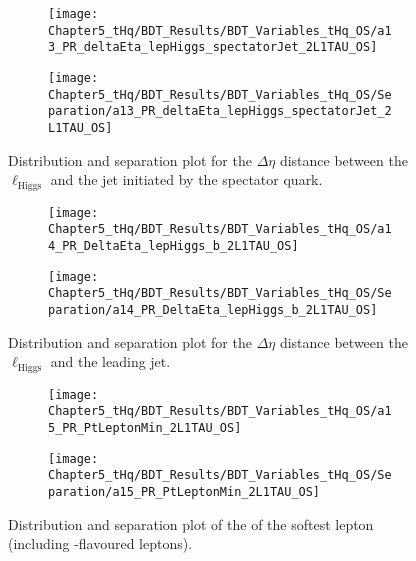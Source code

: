 \begin{figure}[h]
\centering
\begin{subfigure}{.45\textwidth}
  \centering
  \texttt{[image: Chapter5\_tHq/BDT\_Results/BDT\_Variables\_tHq\_OS/a13\_PR\_deltaEta\_lepHiggs\_spectatorJet\_2L1TAU\_OS]}
\end{subfigure}%
\begin{subfigure}{.55\textwidth}
  \centering
  \texttt{[image: Chapter5\_tHq/BDT\_Results/BDT\_Variables\_tHq\_OS/Separation/a13\_PR\_deltaEta\_lepHiggs\_spectatorJet\_2L1TAU\_OS]}
\end{subfigure}
\caption{Distribution and separation plot for the $\Delta \eta$ distance between the $\ell_{\text{Higgs}}$ and
the jet initiated by the spectator quark.}
\label{fig:Appendix:BDTVARS:tHqOS:a13_PR_deltaEta_lepHiggs_spectatorJet}
\end{figure}

\begin{figure}[h]
\centering
\begin{subfigure}{.45\textwidth}
  \centering
  \texttt{[image: Chapter5\_tHq/BDT\_Results/BDT\_Variables\_tHq\_OS/a14\_PR\_DeltaEta\_lepHiggs\_b\_2L1TAU\_OS]}
\end{subfigure}%
\begin{subfigure}{.55\textwidth}
  \centering
  \texttt{[image: Chapter5\_tHq/BDT\_Results/BDT\_Variables\_tHq\_OS/Separation/a14\_PR\_DeltaEta\_lepHiggs\_b\_2L1TAU\_OS]}
\end{subfigure}
\caption{Distribution and separation plot for the $\Delta \eta$ distance between the $\ell_{\text{Higgs}}$ and 
the leading \btagged jet.}
\label{fig:Appendix:BDTVARS:tHqOS:a14_PR_DeltaEta_lepHiggs_b}
\end{figure}

\begin{figure}[h]
\centering
\begin{subfigure}{.45\textwidth}
  \centering
  \texttt{[image: Chapter5\_tHq/BDT\_Results/BDT\_Variables\_tHq\_OS/a15\_PR\_PtLeptonMin\_2L1TAU\_OS]}
\end{subfigure}%
\begin{subfigure}{.55\textwidth}
  \centering
  \texttt{[image: Chapter5\_tHq/BDT\_Results/BDT\_Variables\_tHq\_OS/Separation/a15\_PR\_PtLeptonMin\_2L1TAU\_OS]}
\end{subfigure}
\caption{Distribution and separation plot of the \pT of the softest lepton (including \Ptau-flavoured leptons).}
\label{fig:Appendix:BDTVARS:tHqOS:a15_PR_PtLeptonMin}
\end{figure}

